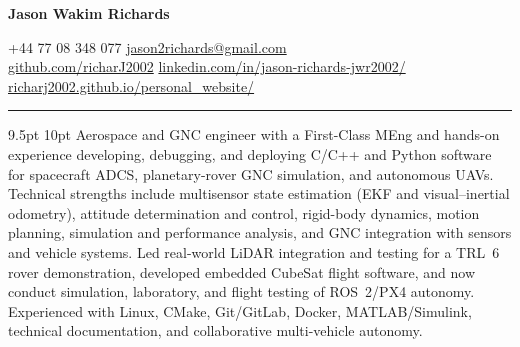\documentclass[10pt,a4paper]{article}
\newcommand{\NameSize}{20pt}
\newcommand{\ContactSize}{8pt}
\newcommand{\StatementSize}{9.5pt}
\newcommand{\NameLineSize}{20pt}
\newcommand{\ContactLineSize}{8pt}
\newcommand{\StatementLineSize}{10pt}
\newcommand{\HeaderKeywordToContact}{5pt}
\newcommand{\HeaderAfter}{-5pt}
\newcommand{\StatementBefore}{0pt}
\newcommand{\CVLineThickness}{0.5pt}
\newcommand{\CVLine}{
    \vspace{\HeaderAfter}
    \noindent
    \textcolor{CVBlack}{
        \rule{\textwidth}{\CVLineThickness}
    }
    \vspace{\HeaderAfter}
}
\begin{document}

\begin{center}


    {
        \fontsize{\NameSize}{\NameLineSize}\selectfont
        \textbf{\textcolor{CVBlack}{Jason Wakim Richards}}
    }


    \vspace{\HeaderKeywordToContact}

    {
        \fontsize{\ContactSize}{\ContactLineSize}
        \selectfont
        \textcolor{CVBlack}
        {
            +44 77 08 348 077
            \quad\textbar\quad
            \href{mailto:jason2richards@gmail.com}{jason2richards@gmail.com}
            \\
            \href{https://github.com/richarJ2002}{github.com/richarJ2002}
            \quad\textbar\quad
            \href{https://www.linkedin.com/in/jason-richards-jwr2002/}
            {linkedin.com/in/jason-richards-jwr2002/}
            \quad\textbar\quad
            \href{https://richarj2002.github.io/personal_website/}{richarj2002.github.io/personal\_website/}
        }
    }

\end{center}



\CVLine

\vspace{\StatementBefore}

{
    \fontsize
    {\StatementSize}
    {\StatementLineSize}
    \selectfont
    \textcolor{CVDarkGray}
    {
        Aerospace and GNC engineer with a First-Class MEng and hands-on experience
        developing, debugging, and deploying C/C++ and Python software for spacecraft
        ADCS, planetary-rover GNC simulation, and autonomous UAVs. Technical strengths
        include multisensor state estimation (EKF and visual--inertial odometry),
        attitude determination and control, rigid-body dynamics, motion planning,
        simulation and performance analysis, and GNC integration with sensors and
        vehicle systems. Led real-world LiDAR integration and testing for a TRL~6 rover
        demonstration, developed embedded CubeSat flight software, and now conduct
        simulation, laboratory, and flight testing of ROS~2/PX4 autonomy. Experienced
        with Linux, CMake, Git/GitLab, Docker, MATLAB/Simulink, technical documentation,
        and collaborative multi-vehicle autonomy.
    }
}
\end{document}
